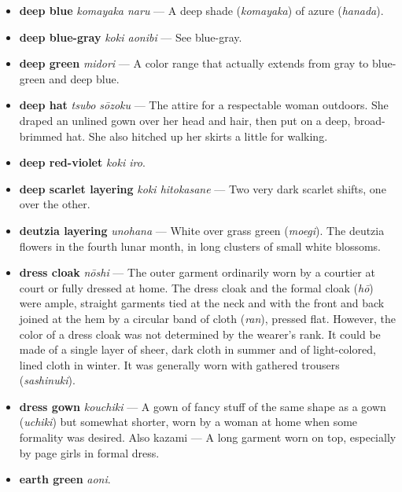 \documentclass{article}
\begin{document}
\begin{multicols*}{2}
\begin{itemize}[
			label=,
			leftmargin=0em,
			rightmargin=-1.5em,
			itemindent=-2em,
			nosep,
		]
		\item \textbf{deep blue} \textit{komayaka naru} --- A deep shade (\textit{komayaka}) of azure (\textit{hanada}).

		\item \textbf{deep blue-gray} \textit{koki aonibi} --- See blue-gray.

		\item \textbf{deep green} \textit{midori} --- A color range that actually extends from gray to blue-green and deep blue.

		\item \textbf{deep hat} \textit{tsubo sōzoku} --- The attire for a respectable woman outdoors. She draped an unlined gown over her head and hair, then put on a deep, broad-brimmed hat. She also hitched up her skirts a little for walking.

		\item \textbf{deep red-violet} \textit{koki iro}.

		\item \textbf{deep scarlet layering} \textit{koki hitokasane} --- Two very dark scarlet shifts, one over the other.

		\item \textbf{deutzia layering} \textit{unohana} --- White over grass green (\textit{moegi}). The deutzia flowers in the fourth lunar month, in long clusters of small white blossoms.

		\item \textbf{dress cloak} \textit{nōshi} --- The outer garment ordinarily worn by a courtier at court or fully dressed at home. The dress cloak and the formal cloak (\textit{hō}) were ample, straight garments tied at the neck and with the front and back joined at the hem by a circular band of cloth (\textit{ran}), pressed flat. However, the color of a dress cloak was not determined by the wearer's rank. It could be made of a single layer of sheer, dark cloth in summer and of light-colored, lined cloth in winter. It was generally worn with gathered trousers (\textit{sashinuki}).

		\item \textbf{dress gown} \textit{kouchiki} --- A gown of fancy stuff of the same shape as a gown (\textit{uchiki}) but somewhat shorter, worn by a woman at home when some formality was desired. Also kazami --- A long garment worn on top, especially by page girls in formal dress.

		\item \textbf{earth green} \textit{aoni}.


\end{itemize}
\end{multicols*}
\end{document}
